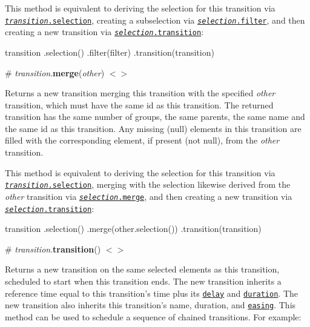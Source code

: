 This method is equivalent to deriving the selection for this transition via \href{#transition_selection}{\tt {\itshape transition}.selection}, creating a subselection via \href{https://github.com/d3/d3-selection#selection_filter}{\tt {\itshape selection}.filter}, and then creating a new transition via \href{#selection_transition}{\tt {\itshape selection}.transition}\+:


\begin{DoxyCode}
transition
  .selection()
  .filter(filter)
  .transition(transition)
\end{DoxyCode}


\label{_transition_merge}%
\# {\itshape transition}.{\bfseries merge}({\itshape other}) \href{https://github.com/d3/d3-transition/blob/master/src/transition/merge.js}{\tt $<$$>$}

Returns a new transition merging this transition with the specified {\itshape other} transition, which must have the same id as this transition. The returned transition has the same number of groups, the same parents, the same name and the same id as this transition. Any missing (null) elements in this transition are filled with the corresponding element, if present (not null), from the {\itshape other} transition.

This method is equivalent to deriving the selection for this transition via \href{#transition_selection}{\tt {\itshape transition}.selection}, merging with the selection likewise derived from the {\itshape other} transition via \href{https://github.com/d3/d3-selection#selection_merge}{\tt {\itshape selection}.merge}, and then creating a new transition via \href{#selection_transition}{\tt {\itshape selection}.transition}\+:


\begin{DoxyCode}
transition
  .selection()
  .merge(other.selection())
  .transition(transition)
\end{DoxyCode}


\label{_transition_transition}%
\# {\itshape transition}.{\bfseries transition}() \href{https://github.com/d3/d3-transition/blob/master/src/transition/transition.js}{\tt $<$$>$}

Returns a new transition on the same selected elements as this transition, scheduled to start when this transition ends. The new transition inherits a reference time equal to this transition’s time plus its \href{#transition_delay}{\tt delay} and \href{#transition_duration}{\tt duration}. The new transition also inherits this transition’s name, duration, and \href{#transition_ease}{\tt easing}. This method can be used to schedule a sequence of chained transitions. For example\+:


